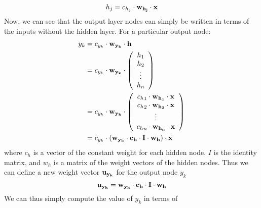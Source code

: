 \documentclass{article}
\begin{document}
\begin{enumerate}
\begin{enumerate}
\begin{equation*}
                    h_j= c_{h_j} \cdot \bf{w_{h_j}} \cdot \bf{x}
                \end{equation*}
                Now, we can see that the output layer nodes can simply be 
                written in terms of the inputs without the hidden layer.
                For a particular output node:
                \begin{align*}
                    y_k
                        &= c_{y_k} \cdot \bf{w_{y_k}} \cdot \bf{h} \\
                        &= c_{y_k} \cdot \bf{w_{y_k}} \cdot
                            \left( \begin{array}{c}
                            h_1 \\
                            h_2 \\
                            \vdots \\
                            h_n 
                            \end{array} \right) \\
                        &= c_{y_k} \cdot \bf{w_{y_k}} \cdot 
                            \left( \begin{array}{c}
                            {c_h}_1 \cdot \bf{w_{h_1}} \cdot \bf{x} \\
                            {c_h}_2 \cdot \bf{w_{h_2}} \cdot \bf{x} \\
                            \vdots \\
                            {c_h}_n \cdot \bf{w_{h_n}} \cdot \bf{x}
                            \end{array} \right) \\
                        &= c_{y_k} \cdot (\bf{w_{y_k}} \cdot \bf{c_h} \cdot
                            I \cdot \bf{w_h}) \cdot \bf{x}
                \end{align*}
                where \(c_h\) is a vector of the constant weight for each
                hidden node, \(I\) is the identity matrix, and \(w_h\) is
                a matrix of the weight vectors of the hidden nodes.
                Thus we can define a new weight vector \(\bf{u_{y_k}}\) for
                the output node \(y_k\)
                \begin{equation*}
                    {\bf{u_{y_k}}}= \bf{w_{y_k}} \cdot \bf{c_h} \cdot \bf{I}
                    \cdot \bf{w_h}
                \end{equation*}
                We can thus simply compute the value of \(y_k\) in terms of

\end{enumerate}
\end{enumerate}
\end{document}

